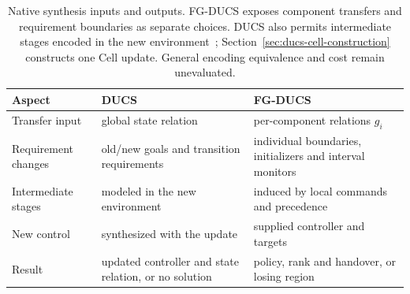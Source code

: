 \begin{table}[!htbp]
\caption{Native synthesis inputs and outputs. FG-DUCS exposes component transfers and requirement boundaries as separate choices. DUCS also permits intermediate stages encoded in the new environment~\cite[Defs.~4.1--4.3, Sec.~4.2]{Nahabedian2020}; Section~\ref{sec:ducs-cell-construction} constructs one Cell update. General encoding equivalence and cost remain unevaluated.}
\label{tab:ducs-interface}
\centering\small
\begin{tabular}{@{}p{.18\linewidth}p{.37\linewidth}p{.39\linewidth}@{}}\toprule
Aspect & DUCS & FG-DUCS\\\midrule
Transfer input & global state relation & per-component relations $g_i$\\
Requirement changes & old/new goals and transition requirements & individual boundaries, initializers and interval monitors\\
Intermediate stages & modeled in the new environment & induced by local commands and precedence\\
New control & synthesized with the update & supplied controller and targets\\
Result & updated controller and state relation, or no solution & policy, rank and handover, or losing region\\\bottomrule
\end{tabular}
\end{table}
